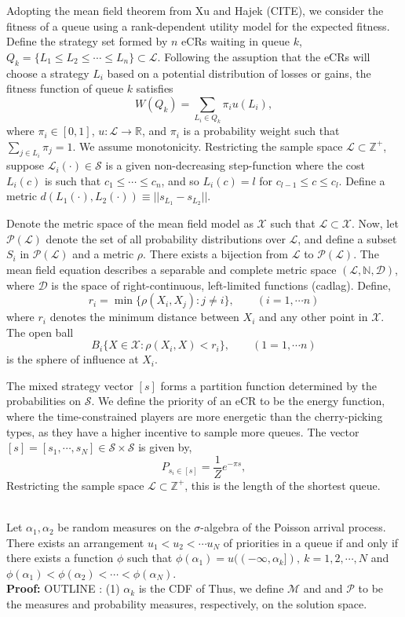 \documentclass[10pt]{article}
\newcommand{\mcL}{\mathcal{L}}
\newcommand{\mcM}{\mathcal{M}}
\newcommand{\mcP}{\mathcal{P}}
\newcommand{\mcX}{\mathcal{X}}
\newcommand{\mcS}{\mathcal{S}}
\newcommand{\mcD}{\mathcal{D}}
\theoremstyle{definition}
\begin{document}
Adopting the mean field theorem from Xu and Hajek (CITE), we consider
the fitness of a queue using a rank-dependent utility model for
the expected fitness. Define the strategy set formed by $n$ eCRs waiting in queue $k$,
$Q_k = \lbrace L_1 \le L_2 \le\cdots \le L_n\rbrace \subset \mcL$.
Following the assuption that the eCRs will choose a strategy $L_i$
based on a potential distribution of losses or gains, the fitness function of
queue $k$ satisfies
$$
    W(Q_k) = \displaystyle\sum_{L_i\in Q_k} \pi_i u(L_i),
$$ 
where $\pi_i\in[0,1]$,
$u:\mcL \rightarrow\mathbb{R}$, and $\pi_i$ is a probability weight such
that $\sum_{j \in L_i}\pi_j = 1$. We assume monotonicity.
Restricting the sample space $\mcL\subset\mathbb{Z}^+$, suppose $\mcL_i(\cdot)\in \mcS$ is a given
non-decreasing step-function where the cost $L_i(c)$ is such that $c_1\le \cdots \le c_n$, and so $L_i(c) = l$ for $c_{l-1}\le c \le c_l$. 
Define a metric $d(L_1(\cdot), L_2(\cdot)) \equiv \vert\vert s_{L_1} -
s_{L_2}\vert\vert$. 

Denote the metric space of the mean field model as $\mcX$ such that $\mcL \subset \mcX$.
Now, let $\mcP(\mcL)$ denote the set of all probability distributions
over $\mcL$, and define a subset $S_i$ in $\mcP(\mcL)$ and a metric $\rho$.
There exists a bijection from $\mcL$ to $\mcP(\mcL)$.
The mean field equation describes a separable and complete metric space
$(\mcL, \mathbb{N}, \mcD)$, where $\mcD$ is the space of right-continuous,
left-limited functions (cadlag). Define,
$$
    r_i = \min\lbrace \rho(X_i, X_j) : j\ne i\rbrace, \qquad (i = 1, \cdots n)
$$
where $r_i$ denotes the minimum distance between $X_i$ and any other point in
$\mcX$. The open ball
$$
    B_i \lbrace X \in \mcX : \rho(X_i, X) < r_i\rbrace, \qquad (1 = 1, \cdots n)
$$
is the sphere of influence at $X_i$.

The mixed strategy vector $[s]$ forms a partition
function determined by the probabilities on $\mcS$. 
We define the priority of an eCR to be the energy function, where the
time-constrained players are more energetic than the cherry-picking types, as
they have a higher incentive to sample more queues.
The vector $[s] = [s_1, \cdots, s_N] \in \mcS\times\mcS$ is given by,
$$
    P_{s_i \in [s]} = \frac{1}{Z} e^{-\pi s},
$$
Restricting the sample space $\mcL\subset\mathbb{Z}^+$,
this is the length of the shortest queue.

{\\
Let $\alpha_1, \alpha_2$ be random measures on the $\sigma$-algebra of the
Poisson arrival process.
There exists an arrangement $u_1<u_2<\cdots u_N$ of priorities in a queue if
and only if there exists a function $\phi$ such that $\phi(\alpha_1) =
u((-\infty,\alpha_k]), \ k = 1,2,\cdots, N$ and $\phi(\alpha_1) <
\phi(\alpha_2) < \cdots < \phi(\alpha_N)$.
}\\
\textbf{Proof:} OUTLINE : (1) $\alpha_k$ is the CDF of 
Thus, we define $\mcM$ and and $\mcP$ to be the measures and probability measures,
respectively, on the solution space.
\end{document}
